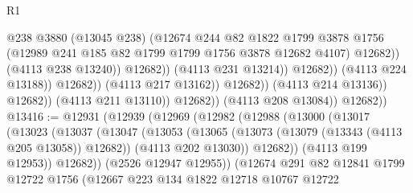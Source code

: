 \begin{lexlean}{R1}
\begin{coremodule}
                                                @238
                                                @3880
                                                (@13045 @238)
                                                (@12674
                                                  @244
                                                  @82
                                                  @1822
                                                  @1799
                                                  @3878
                                                  @1756
                                                  (@12989
                                                    @241
                                                    @185
                                                    @82
                                                    @1799
                                                    @1799
                                                    @1756
                                                    @3878
                                                    @12682
                                                    @4107)
                                                  @12682))
                                              (@4113 @238 @13240))
                                            @12682))
                                        (@4113 @231 @13214))
                                      @12682))
                                  (@4113 @224 @13188))
                                @12682))
                            (@4113 @217 @13162))
                          @12682))
                      (@4113 @214 @13136))
                    @12682))
                (@4113 @211 @13110))
              @12682))
          (@4113 @208 @13084))
        @12682))
@13416 := @12931
    (@12939
      (@12969
        (@12982
          (@12988
            (@13000
              (@13017
                (@13023
                  (@13037
                    (@13047
                      (@13053
                        (@13065
                          (@13073 (@13079 (@13343 (@4113 @205 @13058)) @12682))
                          (@4113 @202 @13030))
                        @12682))
                    (@4113 @199 @12953))
                  @12682))
              (@2526 @12947 @12955))
            (@12674
              @291
              @82
              @12841
              @1799
              @12722
              @1756
              (@12667
                @223
                @134
                @1822
                @12718
                @10767
                @12722

\end{coremodule}
\end{lexlean}
